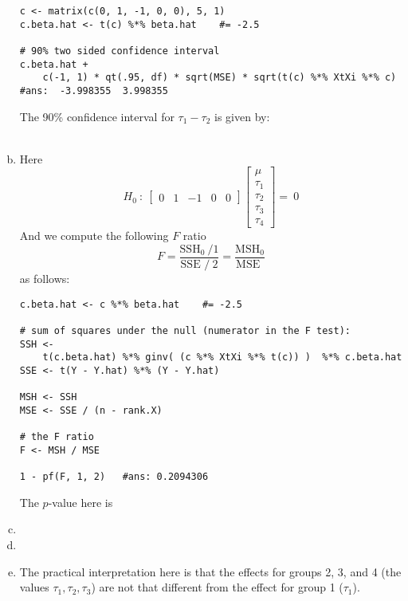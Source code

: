 \documentclass[paper=a4, fontsize=11pt]{scrartcl} %
\begin{document}
\begin{enumerate}[(a)]
 \begin{lstlisting}[basicstyle=\ttfamily\small\bfseries]
c <- matrix(c(0, 1, -1, 0, 0), 5, 1)
c.beta.hat <- t(c) %*% beta.hat    #= -2.5

# 90% two sided confidence interval
c.beta.hat + 
    c(-1, 1) * qt(.95, df) * sqrt(MSE) * sqrt(t(c) %*% XtXi %*% c)
#ans:  -3.998355  3.998355
\end{lstlisting}

 The 90\% confidence interval for $\tau_1 - \tau_2$ is given by:
\\
 \\
 
 
 
\item Here
$$
H_0 \ : \ 
\begin{bmatrix} 0 & 1 & -1 & 0 & 0 
\end{bmatrix}
\begin{bmatrix} \mu\\
                             \tau_1\\
                             \tau_2\\
                             \tau_3\\
                             \tau_4
\end{bmatrix}
= \ 0
$$ 
And we compute the following $F$ ratio
$$
F = \frac{\text{SSH}_0 \ / 1 }{ \text{SSE }  / \ 2 } = \frac{\text{MSH}_0 }{ \text{MSE } } 
$$
as follows:
 \begin{lstlisting}[basicstyle=\ttfamily\small\bfseries]
c.beta.hat <- c %*% beta.hat    #= -2.5

# sum of squares under the null (numerator in the F test):
SSH <- 
    t(c.beta.hat) %*% ginv( (c %*% XtXi %*% t(c)) )  %*% c.beta.hat
SSE <- t(Y - Y.hat) %*% (Y - Y.hat) 

MSH <- SSH
MSE <- SSE / (n - rank.X) 

# the F ratio
F <- MSH / MSE

1 - pf(F, 1, 2)   #ans: 0.2094306
\end{lstlisting}

The $p$-value here is \ \\


\item
\item

\item The practical interpretation here is that the effects for groups 2, 3, and 4 (the values $\tau_1, \tau_2, \tau_3$) are not that different 
from the effect for group 1 ($\tau_1$). 


\end{enumerate}
\end{document}

